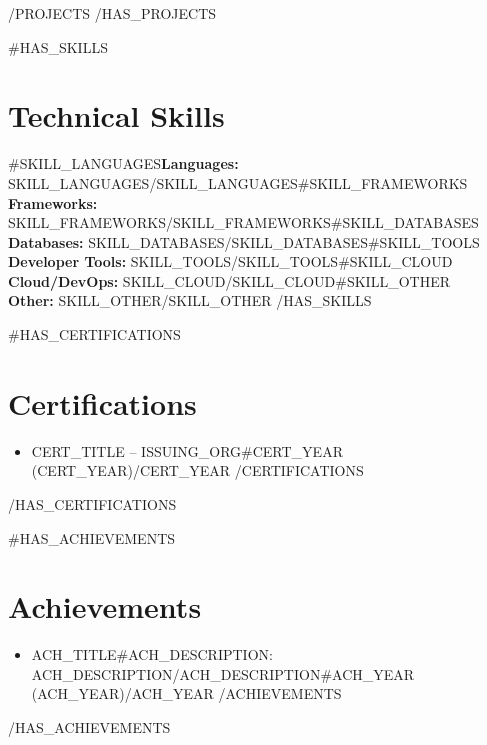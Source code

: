 \documentclass[10pt,letterpaper]{article}
\begin{document}
{{/PROJECTS}}
{{/HAS_PROJECTS}}

{{#HAS_SKILLS}}
\section*{Technical Skills}
{{#SKILL_LANGUAGES}}\textbf{Languages:} {{SKILL_LANGUAGES}}{{/SKILL_LANGUAGES}}{{#SKILL_FRAMEWORKS}}
\\\textbf{Frameworks:} {{SKILL_FRAMEWORKS}}{{/SKILL_FRAMEWORKS}}{{#SKILL_DATABASES}}
\\\textbf{Databases:} {{SKILL_DATABASES}}{{/SKILL_DATABASES}}{{#SKILL_TOOLS}}
\\\textbf{Developer Tools:} {{SKILL_TOOLS}}{{/SKILL_TOOLS}}{{#SKILL_CLOUD}}
\\\textbf{Cloud/DevOps:} {{SKILL_CLOUD}}{{/SKILL_CLOUD}}{{#SKILL_OTHER}}
\\\textbf{Other:} {{SKILL_OTHER}}{{/SKILL_OTHER}}
{{/HAS_SKILLS}}

{{#HAS_CERTIFICATIONS}}
\section*{Certifications}
\begin{itemize}
{{#CERTIFICATIONS}}
\item {{CERT_TITLE}} -- {{ISSUING_ORG}}{{#CERT_YEAR}} ({{CERT_YEAR}}){{/CERT_YEAR}}
{{/CERTIFICATIONS}}
\end{itemize}
{{/HAS_CERTIFICATIONS}}

{{#HAS_ACHIEVEMENTS}}
\section*{Achievements}
\begin{itemize}
{{#ACHIEVEMENTS}}
\item {{ACH_TITLE}}{{#ACH_DESCRIPTION}}: {{ACH_DESCRIPTION}}{{/ACH_DESCRIPTION}}{{#ACH_YEAR}} ({{ACH_YEAR}}){{/ACH_YEAR}}
{{/ACHIEVEMENTS}}
\end{itemize}
{{/HAS_ACHIEVEMENTS}}
\end{document}
